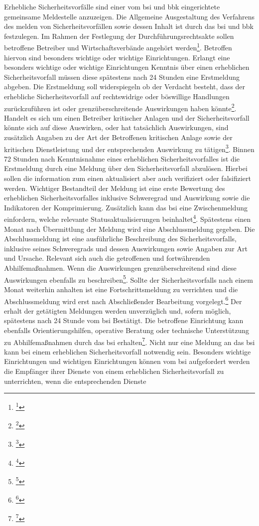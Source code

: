 \documentclass[11pt,a4paper,hidelinks]{article}   %
\begin{document}
        Erhebliche Sicherheitsvorfälle sind einer vom \gls{bsi} und \gls{bbk} eingerichtete gemeinsame Meldestelle anzuzeigen. Die Allgemeine Ausgestaltung des Verfahrens des melden von Sicherheitsvorfällen sowie dessen Inhalt ist durch das \gls{bsi} und \gls{bbk} festzulegen. Im Rahmen der Festlegung der Durchführungsrechtsakte sollen betroffene Betreiber und Wirtschaftsverbände angehört werden\footnote{\footcite[Vgl.][, §32, Absatz 4]{NIS2UmsuCG}}. Betroffen hiervon sind besonders wichtige oder wichtige Einrichtungen. Erlangt eine besonders wichtige oder wichtige Einrichtungen Kenntnis über einen erheblichen Sicherheitsvorfall müssen diese spätestens nach 24 Stunden eine Erstmeldung abgeben. Die Erstmeldung soll widerspiegeln ob der Verdacht besteht, dass der erhebliche Sicherheitsvorfall auf rechtswidrige oder böswillige Handlungen zurückzuführen ist oder grenzüberschreitende Auswirkungen haben könnte\footnote{\footcite[Vgl.][, §32, Absatz 1]{NIS2UmsuCG}}. Handelt es sich um einen Betreiber kritischer Anlagen und der Sicherheitsvorfall könnte sich auf diese Auswirken, oder hat tatsächlich Auswirkungen, sind zusätzlich Angaben zu der Art der Betroffenen kritischen Anlage sowie der kritischen Dienstleistung und der entsprechenden Auswirkung zu tätigen\footnote{\footcite[Vgl.][, §32, Absatz 3]{NIS2UmsuCG}}. Binnen 72 Stunden nach Kenntnisnahme eines erheblichen Sicherheitsvorfalles ist die Erstmeldung durch eine Meldung über den Sicherheitsvorfall abzulösen. Hierbei sollen die information zum einen aktualisiert aber auch verifiziert oder falsifiziert werden. Wichtiger Bestandteil der Meldung ist eine erste Bewertung des erheblichen Sicherheitsvorfalles inklusive Schweregrad und Auswirkung sowie die Indikatoren der Komprimierung. Zusätzlich kann das \gls{bsi} eine Zwischenmeldung einfordern, welche relevante Statusaktualisierungen beinhaltet\footnote{\footcite[Vgl.][, §32, Absatz 1, Nummer 2 \& 3]{NIS2UmsuCG}}.  Spätestens einen Monat nach Übermittlung der Meldung wird eine Abschlussmeldung gegeben. Die Abschlussmeldung ist eine ausführliche  Beschreibung des Sicherheitsvorfalls, inklusive seines Schweregrads und dessen Auswirkungen sowie Angaben zur Art und Ursache. Relevant sich auch die getroffenen und fortwährenden Abhilfemaßnahmen. Wenn die Auswirkungen grenzüberschreitend sind diese Auswirkungen ebenfalls zu beschreiben\footnote{\footcite[Vgl.][, §32, Absatz 4]{NIS2UmsuCG}}. Sollte der Sicherheitsvorfalls nach einem Monat weiterhin anhalten ist eine Fortschrittsmeldung zu verrichten und die Abschlussmeldung wird erst nach Abschließender Bearbeitung vorgelegt.\footnote{\footcite[Vgl.][, §32, Absatz 2]{NIS2UmsuCG}} Der erhalt der getätigten Meldungen werden unverzüglich und, sofern möglich, spätestens nach 24 Stunde vom \gls{bsi} Bestätigt. Die betroffene Einrichtung kann ebenfalls Orientierungshilfen, operative Beratung oder technische Unterstützung zu Abhilfemaßnahmen durch das \gls{bsi} erhalten\footnote{\footcite[Vgl.][, §36, Absatz 1]{NIS2UmsuCG}}. Nicht nur eine Meldung an das \gls{bsi} kann bei einem erheblichen Sicherheitsvorfall notwendig sein. Besonders wichtige Einrichtungen und wichtigen Einrichtungen können vom \gls{bsi} aufgefordert werden die Empfänger ihrer Dienste von einem erheblichen Sicherheitsvorfall zu unterrichten, wenn die entsprechenden Dienste 
\end{document}
